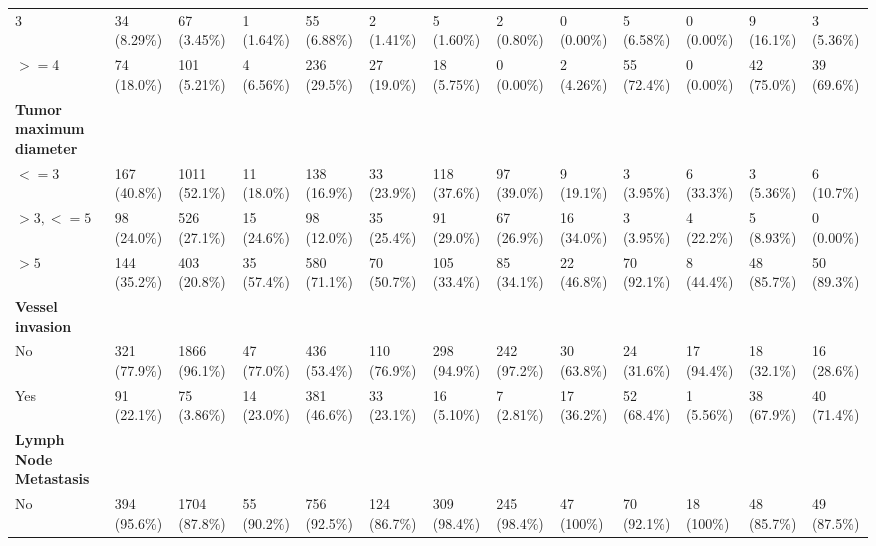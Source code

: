 \documentclass{article}
\begin{document}
\begin{landscape}
\begin{tiny}
\begin{tabularx}{\linewidth}{p{4.5cm}|X|X|X|X|X|X|X|X|X|X|X|X}
\rowcolor{gray!10}
    3 &    34 (8.29\%)    &    67 (3.45\%)    &    1 (1.64\%)     &    55 (6.88\%)    &    2 (1.41\%)     &    5 (1.60\%)     &    2 (0.80\%)     &    0 (0.00\%)     &    5 (6.58\%)     &    0 (0.00\%)     &    9 (16.1\%)     &    3 (5.36\%)     \\
\rowcolor{gray!10}
    $>=$4 &    74 (18.0\%)    &   101 (5.21\%)    &    4 (6.56\%)     &   236 (29.5\%)    &    27 (19.0\%)    &    18 (5.75\%)    &    0 (0.00\%)     &    2 (4.26\%)     &    55 (72.4\%)    &    0 (0.00\%)     &    42 (75.0\%)    &    39 (69.6\%)    \\
\rowcolor{gray!30}
\textbf{Tumor maximum diameter }  &  &  &  &  &  &  &  &  &  &  &  &  \\
\rowcolor{gray!10}
    $<=3$ &   167 (40.8\%)    &   1011 (52.1\%)   &    11 (18.0\%)    &   138 (16.9\%)    &    33 (23.9\%)    &   118 (37.6\%)    &    97 (39.0\%)    &    9 (19.1\%)     &    3 (3.95\%)     &    6 (33.3\%)     &    3 (5.36\%)     &    6 (10.7\%)     \\
\rowcolor{gray!10}
    $>3, <=5$ &    98 (24.0\%)    &   526 (27.1\%)    &    15 (24.6\%)    &    98 (12.0\%)    &    35 (25.4\%)    &    91 (29.0\%)    &    67 (26.9\%)    &    16 (34.0\%)    &    3 (3.95\%)     &    4 (22.2\%)     &    5 (8.93\%)     &    0 (0.00\%)     \\
\rowcolor{gray!10}
    $>5$ &   144 (35.2\%)    &   403 (20.8\%)    &    35 (57.4\%)    &   580 (71.1\%)    &    70 (50.7\%)    &   105 (33.4\%)    &    85 (34.1\%)    &    22 (46.8\%)    &    70 (92.1\%)    &    8 (44.4\%)     &    48 (85.7\%)    &    50 (89.3\%)    \\
\rowcolor{gray!30}
\textbf{Vessel invasion }  &  &  &  &  &  &  &  &  &  &  &  &  \\
\rowcolor{gray!10}
    No &   321 (77.9\%)    &   1866 (96.1\%)   &    47 (77.0\%)    &   436 (53.4\%)    &   110 (76.9\%)    &   298 (94.9\%)    &   242 (97.2\%)    &    30 (63.8\%)    &    24 (31.6\%)    &    17 (94.4\%)    &    18 (32.1\%)    &    16 (28.6\%)    \\
\rowcolor{gray!10}
    Yes &    91 (22.1\%)    &    75 (3.86\%)    &    14 (23.0\%)    &   381 (46.6\%)    &    33 (23.1\%)    &    16 (5.10\%)    &    7 (2.81\%)     &    17 (36.2\%)    &    52 (68.4\%)    &    1 (5.56\%)     &    38 (67.9\%)    &    40 (71.4\%)    \\
\rowcolor{gray!30}
\textbf{Lymph Node Metastasis }  &  &  &  &  &  &  &  &  &  &  &  &  \\
\rowcolor{gray!10}
    No &   394 (95.6\%)    &   1704 (87.8\%)   &    55 (90.2\%)    &   756 (92.5\%)    &   124 (86.7\%)    &   309 (98.4\%)    &   245 (98.4\%)    &    47 (100\%)     &    70 (92.1\%)    &    18 (100\%)     &    48 (85.7\%)    &    49 (87.5\%)    \\

\end{tabularx}
\end{tiny}
\end{landscape}
\end{document}
